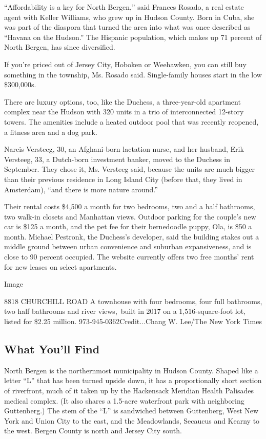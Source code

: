 ``Affordability is a key for North Bergen,'' said Frances Rosado, a real
estate agent with Keller Williams, who grew up in Hudson County. Born in
Cuba, she was part of the diaspora that turned the area into what was
once described as ``Havana on the Hudson.'' The Hispanic population,
which makes up 71 percent of North Bergen, has since diversified.

If you're priced out of Jersey City, Hoboken or Weehawken, you can still
buy something in the township, Ms. Rosado said. Single-family houses
start in the low \$300,000s.

There are luxury options, too, like the Duchess, a three-year-old
apartment complex near the Hudson with 320 units in a trio of
interconnected 12-story towers. The amenities include a heated outdoor
pool that was recently reopened, a fitness area and a dog park.

Narcis Versteeg, 30, an Afghani-born lactation nurse, and her husband,
Erik Versteeg, 33, a Dutch-born investment banker, moved to the Duchess
in September. They chose it, Ms. Versteeg said, because the units are
much bigger than their previous residence in Long Island City (before
that, they lived in Amsterdam), ``and there is more nature around.''

Their rental costs \$4,500 a month for two bedrooms, two and a half
bathrooms, two walk-in closets and Manhattan views. Outdoor parking for
the couple's new car is \$125 a month, and the pet fee for their
bernedoodle puppy, Ola, is \$50 a month. Michael Pestronk, the Duchess's
developer, said the building stakes out a middle ground between urban
convenience and suburban expansiveness, and is close to 90 percent
occupied. The website currently offers two free months' rent for new
leases on select apartments.

Image

8818 CHURCHILL ROAD \textbar{} A townhouse with four bedrooms, four full
bathrooms, two half bathrooms and river views,~built in 2017 on a
1,516-square-foot lot, listed for \$2.25 million.
973-945-0362Credit...Chang W. Lee/The New York Times

\hypertarget{what-youll-find}{%
\subsection{What You'll Find}\label{what-youll-find}}

North Bergen is the northernmost municipality in Hudson County. Shaped
like a letter ``L'' that has been turned upside down, it has a
proportionally short section of riverfront, much of it taken up by the
Hackensack Meridian Health Palisades medical complex. (It also shares a
1.5-acre waterfront park with neighboring Guttenberg.) The stem of the
``L'' is sandwiched between Guttenberg, West New York and Union City to
the east, and the Meadowlands, Secaucus and Kearny to the west. Bergen
County is north and Jersey City south.

